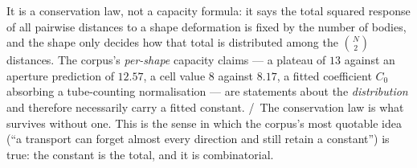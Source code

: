 \begin{remark}\label{rem:sumrule-meaning}
It is a conservation law, not a capacity formula: it says the total squared response of all
pairwise distances to a shape deformation is fixed by the number of bodies, and the shape only
decides how that total is distributed among the $\binom N2$ distances. The corpus's
\emph{per-shape} capacity claims --- a plateau of $13$ against an aperture prediction of $12.57$,
a cell value $8$ against $8.17$, a fitted coefficient $C_0$ absorbing a tube-counting
normalisation --- are statements about the \emph{distribution} and therefore necessarily carry a
fitted constant. \V/\Hh\ The conservation law is what survives without one. This is the sense in
which the corpus's most quotable idea (``a transport can forget almost every direction and still
retain a constant'') is true: the constant is the total, and it is combinatorial.
\end{remark}
